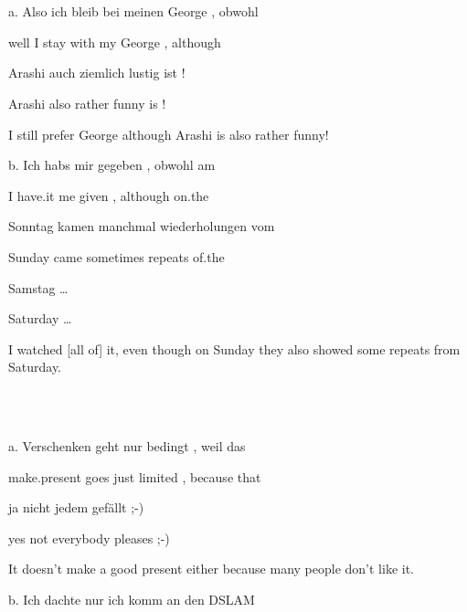 \ea%
    \label{ex:key:1}
    \gll\\
        \\
    \glt
    \z

          a.  Also  ich  bleib    bei  meinen  George  ,  obwohl



well  I  stay    with  my    George  ,  although



Arashi  auch    ziemlich  lustig    ist  !



Arashi  also    rather    funny    is  !



I still prefer George although Arashi is also rather funny!



b.  Ich  habs    mir  gegeben  ,  obwohl  am



I  have.it  me  given    ,  although  on.the



Sonntag kamen  manchmal    wiederholungen  vom



Sunday  came  sometimes    repeats    of.the



Samstag  …



Saturday  …



I watched [all of] it, even though on Sunday they also showed some re\-peats from Saturday.



\ea%
    \label{ex:key:2}
    \gll\\
        \\
    \glt
    \z

          a.  Verschenken  geht  nur  bedingt  ,  weil    das



make.present  goes  just  limited  ,  because  that



ja  nicht    jedem  gefällt  ;-)



yes  not    everybody  pleases  ;-)



It doesn’t make a good present either because many people don’t like it.



b.  Ich  dachte  nur  ich  komm  an  den  DSLAM



